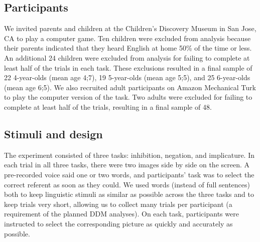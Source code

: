 \documentclass[10pt,letterpaper]{article}
\newcommand{\aen}[1]{\textcolor{DarkOrange}{[aen: #1]}}
\begin{document}

\subsection{Participants}

We invited parents and children at the Children's Discovery Museum in San Jose, CA to play a computer game. Ten children were excluded from analysis because their parents indicated that they heard English at home 50\% of the time or less. An additional 24 children were excluded from analysis for failing to complete at least half of the trials in each task. These exclusions resulted in a final sample of 22 4-year-olds (mean age 4;7), 19 5-year-olds (mean age 5;5), and 25 6-year-olds (mean age 6;5). We also recruited adult participants on Amazon Mechanical Turk to play the computer version of the task. Two adults were excluded for failing to complete at least half of the trials, resulting in a final sample of 48.

\subsection{Stimuli and design}

The experiment consisted of three tasks: inhibition, negation, and implicature. In each trial in all three tasks, there were two images side by side on the screen. A pre-recorded voice said one or two words, and participants' task was to select the correct referent as soon as they could. We used words (instead of full sentences) both to keep linguistic stimuli as similar as possible across the three tasks and to keep trials very short, allowing us to collect many trials per participant (a requirement of the planned DDM analyses). On each task, participants were instructed to select the corresponding picture as quickly and accurately as possible.  
\end{document}
